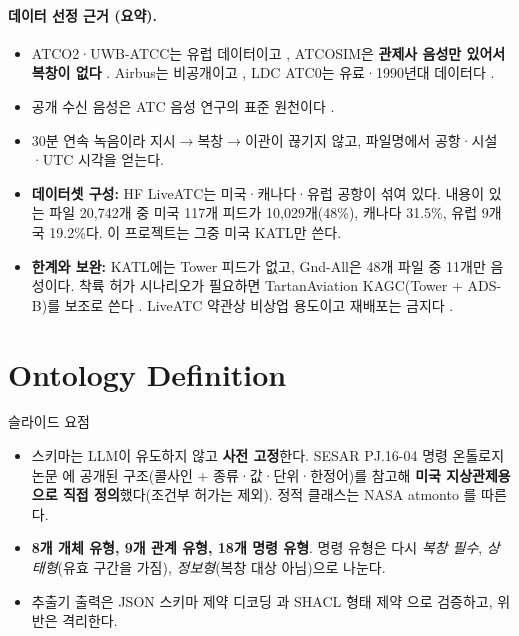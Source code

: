 \documentclass[10pt,a4paper]{article}
\newcommand{\cmd}[1]{\textsf{\small #1}}
\begin{document}
\paragraph{데이터 선정 근거 (요약).}
\begin{itemize}
\item ATCO2·UWB-ATCC는 유럽 데이터이고 \cite{atco2,uwbatcc}, ATCOSIM은 \textbf{관제사 음성만 있어서 복창이 없다} \cite{atcosim}. Airbus는 비공개이고 \cite{airbusatc}, LDC ATC0는 유료·1990년대 데이터다 \cite{atc0}.
\item 공개 수신 음성은 ATC 음성 연구의 표준 원천이다 \cite{atco2,zuluaga2021}.
\item 30분 연속 녹음이라 지시$\to$복창$\to$이관이 끊기지 않고, 파일명에서 공항·시설·UTC 시각을 얻는다.
\item \textbf{데이터셋 구성:} HF LiveATC는 미국·캐나다·유럽 공항이 섞여 있다. 내용이 있는 파일 20,742개 중 미국 117개 피드가 10,029개(48\%), 캐나다 31.5\%, 유럽 9개국 19.2\%다. 이 프로젝트는 그중 미국 KATL만 쓴다.
\item \textbf{한계와 보완:} KATL에는 Tower 피드가 없고, \cmd{Gnd-All}은 48개 파일 중 11개만 음성이다. 착륙 허가 시나리오가 필요하면 TartanAviation KAGC(Tower + ADS-B)를 보조로 쓴다 \cite{tartan2025}. LiveATC 약관상 비상업 용도이고 재배포는 금지다 \cite{hfliveatc}.
\end{itemize}

\section{Ontology Definition}
\begin{keybox}{슬라이드 요점}
\begin{itemize}[leftmargin=12pt]
\item 스키마는 LLM이 유도하지 않고 \textbf{사전 고정}한다. SESAR PJ.16-04 명령 온톨로지 논문 \cite{helmke2018}에 공개된 구조(콜사인 + 종류·값·단위·한정어)를 참고해 \textbf{미국 지상관제용으로 직접 정의}했다(조건부 허가는 제외). 정적 클래스는 NASA atmonto \cite{keller2017}를 따른다.
\item \textbf{8개 개체 유형, 9개 관계 유형, 18개 명령 유형}. 명령 유형은 다시 \emph{복창 필수}, \emph{상태형}(유효 구간을 가짐), \emph{정보형}(복창 대상 아님)으로 나눈다.
\item 추출기 출력은 JSON 스키마 제약 디코딩 \cite{willard2023}과 SHACL 형태 제약 \cite{shacl}으로 검증하고, 위반은 격리한다.
\end{itemize}
\end{keybox}
\end{document}
